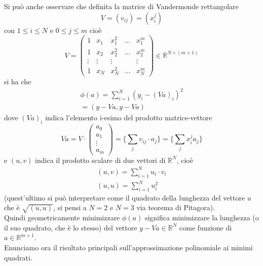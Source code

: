 Si può anche osservare che definita la matrice di Vandermonde rettangolare
\[
V = (v_{ij}) = (x_i^j)
\]
con $1 \leq i \leq N$ e $0 \leq j \leq m$ cioè\\
\[
V = 
\begin{pmatrix}
1 & x_1 & x_1^2 & \dotso & x_1^m \\
1 & x_2 & x_2^2 & \dotso & x_2^m \\
\vdots & \vdots & \vdots & & \vdots \\
1 & x_N & x_N^2 & \dotso & x_N^m
\end{pmatrix}
\in \mathbb{R}^{N \times (m+1)}
\]
si ha che
\[
\begin{split}
    \phi (a) = \sum_{i=1}^N (y_i - (Va)_i)^2\\
    = (y - Va, y - Va)
\end{split}
\]
dove $(Va)_i$ indica l'elemento i-esimo
del prodotto matrice-vettore
\[
Va = V \cdot 
\begin{pmatrix}
a_0 \\ a_1 \\ \vdots \\ a_m
\end{pmatrix}
= \{ \sum_j v_{ij} \cdot a_j \} = \{ \sum_j x_i^j a_j \}
\]
e $(u,v)$ indica il prodotto scalare di due vettori di $\mathbb{R}^N$, cioè 
\[
\begin{split}
(u,v) = \sum\limits_{i=1}^N u_i \cdot v_i \\
(u,u) = \sum\limits_{i=1}^N u_i^2
\end{split}
\]
(quest'ultimo si può interpretare come il quadrato della lunghezza del vettore $u$ che è $\sqrt{(u,u)}$, si pensi a $N=2$ e $N=3$ via teorema di Pitagora).\\
Quindi geometricamente minimizzare $\phi(a)$ significa minimizzare la
lunghezza (o il suo quadrato, che è lo stesso) del vettore $y - Va \in \mathbb{R}^N$ come funzione di $a \in \mathbb{R}^{m+1}$.\\
Enunciamo ora il risultato principali sull'approssimazione polinomiale ai minimi quadrati.

